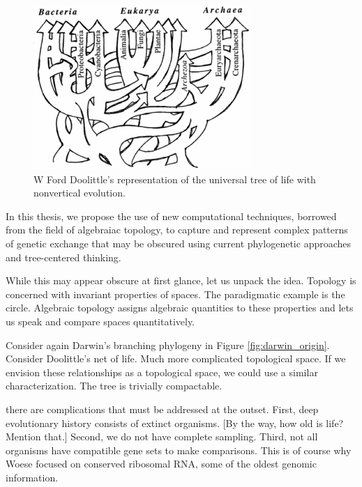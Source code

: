 \begin{figure}
\includegraphics[width=\columnwidth]{./fig/introduction/doolittle_tree.png}
\caption[Ford Doolittle's Tree]{W Ford Doolittle's representation of the universal tree of life with nonvertical evolution.}
\label{fig:doolittle_tree}
\end{figure}

In this thesis, we propose the use of new computational techniques, borrowed from the field of algebraiac topology, to capture and represent complex patterns of genetic exchange that may be obscured using current phylogenetic approaches and tree-centered thinking.

While this may appear obscure at first glance, let us unpack the idea.
Topology is concerned with invariant properties of spaces.
The paradigmatic example is the circle.
Algebraic topology assigns algebraic quantities to these properties and lets us speak and compare spaces quantitatively.

Consider again Darwin's branching phylogeny in Figure \ref{fig:darwin_origin}.
Consider Doolittle's net of life.
Much more complicated topological space.
If we envision these relationships as a topological space, we could use a similar characterization.
The tree is trivially compactable.

there are complications that must be addressed at the outset.
First, deep evolutionary history consists of extinct organisms.
[By the way, how old is life? Mention that.]
Second, we do not have complete sampling.
Third, not all organisms have compatible gene sets to make comparisons.
This is of course why Woese focused on conserved ribosomal RNA, some of the oldest genomic information.

